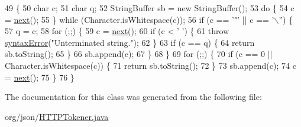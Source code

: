 \begin{DoxyCode}
49                                                    \{
50         \textcolor{keywordtype}{char} c;
51         \textcolor{keywordtype}{char} q;
52         StringBuffer sb = \textcolor{keyword}{new} StringBuffer();
53         \textcolor{keywordflow}{do} \{
54             c = \hyperlink{classorg_1_1json_1_1_j_s_o_n_tokener_ae129753dbe43ea50aa34e3c06773fdfb}{next}();
55         \} \textcolor{keywordflow}{while} (Character.isWhitespace(c));
56         \textcolor{keywordflow}{if} (c == \textcolor{charliteral}{'"'} || c == \textcolor{charliteral}{'\(\backslash\)''}) \{
57             q = c;
58             \textcolor{keywordflow}{for} (;;) \{
59                 c = \hyperlink{classorg_1_1json_1_1_j_s_o_n_tokener_ae129753dbe43ea50aa34e3c06773fdfb}{next}();
60                 \textcolor{keywordflow}{if} (c < \textcolor{charliteral}{' '}) \{
61                     \textcolor{keywordflow}{throw} \hyperlink{classorg_1_1json_1_1_j_s_o_n_tokener_a467f559950c039f28394ce3a0d2659ca}{syntaxError}(\textcolor{stringliteral}{"Unterminated string."});
62                 \}
63                 \textcolor{keywordflow}{if} (c == q) \{
64                     \textcolor{keywordflow}{return} sb.toString();
65                 \}
66                 sb.append(c);
67             \}
68         \}
69         \textcolor{keywordflow}{for} (;;) \{
70             \textcolor{keywordflow}{if} (c == 0 || Character.isWhitespace(c)) \{
71                 \textcolor{keywordflow}{return} sb.toString();
72             \}
73             sb.append(c);
74             c = \hyperlink{classorg_1_1json_1_1_j_s_o_n_tokener_ae129753dbe43ea50aa34e3c06773fdfb}{next}();
75         \}
76     \}
\end{DoxyCode}


The documentation for this class was generated from the following file\-:\begin{DoxyCompactItemize}
\item 
org/json/\hyperlink{_h_t_t_p_tokener_8java}{H\-T\-T\-P\-Tokener.\-java}\end{DoxyCompactItemize}
